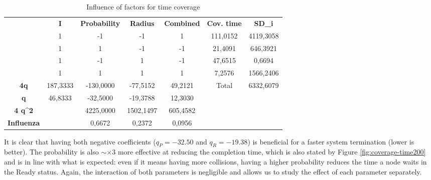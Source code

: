 \begin{table}[H]
\centering
\begin{tabular}{c|c|c|c|c|cc}
\cline{2-7}
 & \textbf{I} & \textbf{Probability} & \textbf{Radius} & \textbf{Combined} & \multicolumn{1}{c|}{\textbf{Cov. time}} & \multicolumn{1}{c|}{\textbf{SD\_i}} \\ \cline{2-7} 
 & 1 & -1 & -1 & 1 & \multicolumn{1}{c|}{111,0152} & \multicolumn{1}{c|}{4119,3058} \\ \cline{2-7} 
 & 1 & 1 & -1 & -1 & \multicolumn{1}{c|}{21,4091} & \multicolumn{1}{c|}{646,3921} \\ \cline{2-7} 
 & 1 & -1 & 1 & -1 & \multicolumn{1}{c|}{47,6515} & \multicolumn{1}{c|}{0,6694} \\ \cline{2-7} 
 & 1 & 1 & 1 & 1 & \multicolumn{1}{c|}{7,2576} & \multicolumn{1}{c|}{1566,2406} \\ \hline
\multicolumn{1}{|c|}{\textbf{4q}} & 187,3333 & -130,0000 & -77,5152 & 49,2121 & \multicolumn{1}{c|}{Total} & \multicolumn{1}{c|}{6332,6079} \\ \hline
\multicolumn{1}{|c|}{\textbf{q}} & 46,8333 & -32,5000 & -19,3788 & 12,3030 &  &  \\ \cline{1-5}
\multicolumn{1}{|c|}{\textbf{4 q\textasciicircum{}2}} &  & 4225,0000 & 1502,1497 & 605,4582 &  &  \\ \cline{1-5}
\multicolumn{1}{|c|}{\textbf{Influenza}} &  & 0,6672 & 0,2372 & 0,0956 &  &  \\ \cline{1-5}
\end{tabular}
\caption{Influence of factors for time coverage}
\label{tab:influence-on-time-coverage}
\end{table}

It is clear that having both negative coefficients ($q_P = -32.50$ and $q_R = -19.38$) is beneficial for a faster system termination (lower is better). The probability is also $\sim\times 3$ more effective at reducing the completion time, which is also stated by Figure \ref{fig:coverage-time200} and is in line with what is expected: even if it means having more collisions, having a higher probability reduces the time a node waits in the Ready status. Again, the interaction of both parameters is negligible and allows us to study the effect of each parameter separately.
